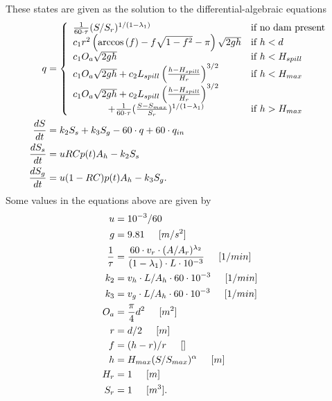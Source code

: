 \documentclass[12pt]{article}
\begin{document}
These states are given as the solution to the differential-algebraic equations
\begin{align*}
 q &= \left\{ \begin{array}{ll} \frac{1}{60 \cdot \tau} (S/S_r)^{1/(1-\lambda_1)} & \mbox{if no dam present} \\
   c_1 r^2 \left( \arccos{(f)} - f \sqrt{1-f^2} - \pi \right) \sqrt{2 g h} & \mbox{if } h < d \\
   c_1 O_a \sqrt{2 g h} & \mbox{if } h < H_{spill} \\
   c_1 O_a \sqrt{2 g h} + c_2 L_{spill} \left(\frac{h - H_{spill}}{H_r}\right)^{3/2} & \mbox{if } h < H_{max} \\
   c_1 O_a \sqrt{2 g h} + c_2 L_{spill} \left(\frac{h - H_{spill}}{H_r}\right)^{3/2} & \\
	\hspace{.5in} + \frac{1}{60 \cdot \tau} (\frac{S-S_{max}}{S_r})^{1/(1-\lambda_1)} & \mbox{if } h > H_{max}
 \end{array} \right. \\
 \frac{dS}{dt} &= k_2 S_s + k_3 S_g - 60 \cdot q + 60 \cdot q_{in} \\
 \frac{dS_s}{dt} &= u RC p(t) A_h - k_2 S_s \\
 \frac{dS_g}{dt} &= u (1-RC) p(t) A_h - k_3 S_g.
\end{align*}
Some values in the equations above are given by
\begin{align*}
 u &= 10^{-3}/60 \\
 g &= 9.81 \hspace{.2in} [m/s^2] \\
 \frac{1}{\tau} &= \frac{60 \cdot v_r \cdot (A/A_r)^{\lambda_2}}{(1-\lambda_1) \cdot L \cdot 10^{-3}} \hspace{.2in} [1/min] \\
 k_2 &= v_h \cdot L / A_h \cdot 60 \cdot 10^{-3} \hspace{.2in} [1/min] \\
 k_3 &= v_g \cdot L / A_h \cdot 60 \cdot 10^{-3} \hspace{.2in} [1/min] \\
 O_a &= \frac{\pi}{4} d^2 \hspace{.2in} [m^2] \\
 r &= d/2 \hspace{.2in} [m] \\
 f &= (h-r)/r \hspace{.2in} [] \\
 h &= H_{max} (S/S_{max})^{\alpha} \hspace{.2in} [m] \\
 H_r &= 1 \hspace{.2in} [m] \\
 S_r &= 1 \hspace{.2in} [m^3].
\end{align*}
\end{document}

